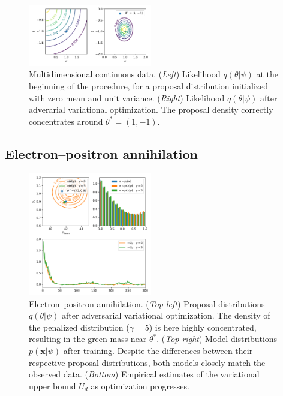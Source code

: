 \documentclass[twocolumn,superscriptaddress,aps]{revtex4-1}
\theoremstyle{plain}
\begin{document}
\begin{figure}
    \centering
    \includegraphics[width=0.48\textwidth]{figures/multi.pdf}
    \caption{Multidimensional continuous data.
             ({\it Left}) Likelihood $q(\theta|\psi)$ at the beginning of the procedure, for a proposal distribution initialized with zero mean and unit variance.
             ({\it Right}) Likelihood $q(\theta|\psi)$ after adverarial variational optimization. The proposal density correctly concentrates around $\theta^* = (1, -1)$.
             }\label{fig:multi}
\end{figure}


\subsection{Electron--positron annihilation}

\begin{figure}
    \centering
    \includegraphics[width=0.48\textwidth]{figures/weinberg.pdf}
    \caption{Electron--positron annihilation.
    ({\it Top left}) Proposal distributions $q(\theta|\psi)$ after adversarial variational optimization. The density of the penalized distribution ($\gamma=5$) is here highly concentrated, resulting in the green mass near $\theta^*$.
    ({\it Top right}) Model distributions $p(\mathbf{x}|\psi)$ after training. Despite the differences between their respective proposal distributions, both models closely match the observed data.
    ({\it Bottom}) Empirical estimates of the variational upper bound $U_d$ as optimization progresses.
             }\label{fig:weinberg}
\end{figure}
\end{document}
